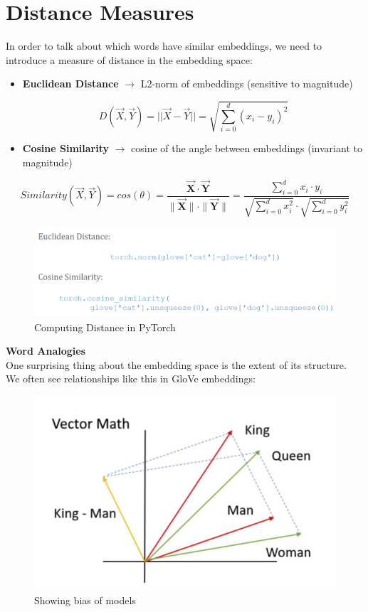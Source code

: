 \section{Distance Measures}

In order to talk about which words have similar embeddings, we need to
introduce a measure of distance in the embedding space:
\begin{itemize}
  \item \textbf{Euclidean Distance} $\rightarrow$ L2-norm of embeddings (sensitive to magnitude)

\[ D(\vec{X}, \vec{Y}) = || \vec{X} - \vec{Y} || = \sqrt{\sum_{i=0}^{d}(x_i - y_i)^2}\]

  \item \textbf{Cosine Similarity} $\rightarrow$ cosine of the angle between embeddings (invariant to magnitude)
\end{itemize}


\[ Similarity(\vec{X}, \vec{Y}) = cos(\theta) = \frac{{\mathbf{\vec{X}} \cdot \mathbf{\vec{Y}}}}{{\|\mathbf{\vec{X}}\| \cdot \|\mathbf{\vec{Y}}\|}} = \frac{{\sum_{i=0}^{d} x_i \cdot y_i}}{{\sqrt{\sum_{i=0}^{d} x_i^2} \cdot \sqrt{\sum_{i=0}^{d} y_i^2}}}\]

\begin{figure}[h!t]
    \centering
    \includegraphics[width=0.9\linewidth]{distancepy.png}
    \caption{Computing Distance in PyTorch}
    \label{fig:enter-label}
\end{figure}

\newpage

\noindent
\textbf{Word Analogies}\\
One surprising thing about the embedding space is the extent of its structure.\\
We often see relationships like this in GloVe embeddings:

\begin{figure}[h!t]
    \centering
    \includegraphics[width=0.7\linewidth]{gloverelationships.png}
    \caption{Showing bias of models}
    \label{fig:enter-label}
\end{figure}

